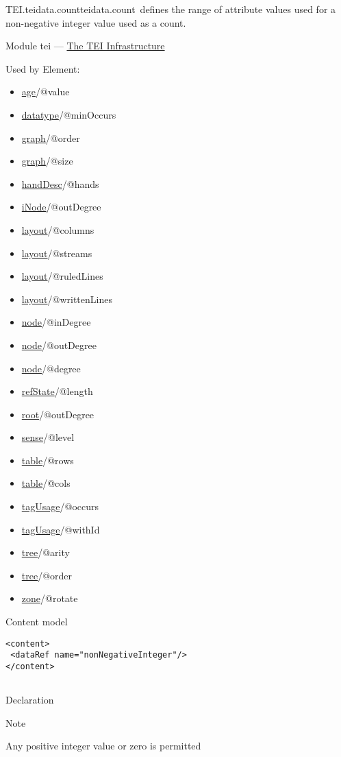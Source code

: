 \begin{reflist}
\item[]\begin{specHead}{TEI.teidata.count}{teidata.count} defines the range of attribute values used for a non-negative integer value used as a count.\end{specHead} 
    \item[{Module}]
  tei — \hyperref[ST]{The TEI Infrastructure}
    \item[{Used by}]
  Element: \begin{itemize}
\item \hyperref[TEI.age]{age}/@value
\item \hyperref[TEI.datatype]{datatype}/@minOccurs
\item \hyperref[TEI.graph]{graph}/@order
\item \hyperref[TEI.graph]{graph}/@size
\item \hyperref[TEI.handDesc]{handDesc}/@hands
\item \hyperref[TEI.iNode]{iNode}/@outDegree
\item \hyperref[TEI.layout]{layout}/@columns
\item \hyperref[TEI.layout]{layout}/@streams
\item \hyperref[TEI.layout]{layout}/@ruledLines
\item \hyperref[TEI.layout]{layout}/@writtenLines
\item \hyperref[TEI.node]{node}/@inDegree
\item \hyperref[TEI.node]{node}/@outDegree
\item \hyperref[TEI.node]{node}/@degree
\item \hyperref[TEI.refState]{refState}/@length
\item \hyperref[TEI.root]{root}/@outDegree
\item \hyperref[TEI.sense]{sense}/@level
\item \hyperref[TEI.table]{table}/@rows
\item \hyperref[TEI.table]{table}/@cols
\item \hyperref[TEI.tagUsage]{tagUsage}/@occurs
\item \hyperref[TEI.tagUsage]{tagUsage}/@withId
\item \hyperref[TEI.tree]{tree}/@arity
\item \hyperref[TEI.tree]{tree}/@order
\item \hyperref[TEI.zone]{zone}/@rotate
\end{itemize} 
    \item[{Content model}]
  \mbox{}\hfill\\[-10pt]\begin{Verbatim}[fontsize=\small]
<content>
 <dataRef name="nonNegativeInteger"/>
</content>
    
\end{Verbatim}

    \item[{Declaration}]
    \item[{Note}]
  \par
Any positive integer value or zero is permitted
\end{reflist}  
